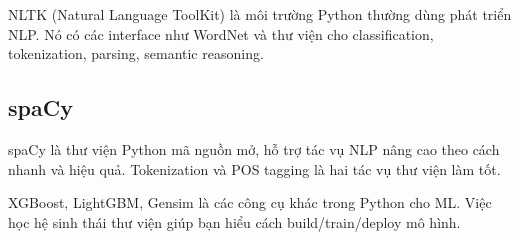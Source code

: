 \begin{dinhnghia}[title={NLTK}]
NLTK (Natural Language ToolKit) là môi trường Python thường dùng phát triển NLP.
Nó có các interface như WordNet và thư viện cho classification, tokenization, parsing, semantic reasoning.
\end{dinhnghia}

\subsection{spaCy}

\begin{dinhnghia}[title={spaCy}]
spaCy là thư viện Python mã nguồn mở, hỗ trợ tác vụ NLP nâng cao theo cách nhanh và hiệu quả.
Tokenization và POS tagging là hai tác vụ thư viện làm tốt.
\end{dinhnghia}

\begin{luuy}[title={Các tool/framework khác}]
XGBoost, LightGBM, Gensim là các công cụ khác trong Python cho ML.
Việc học hệ sinh thái thư viện giúp bạn hiểu cách build/train/deploy mô hình.
\end{luuy}
